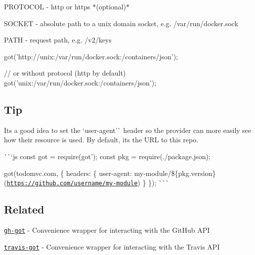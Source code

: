 \begin{DoxyItemize}
\item {\ttfamily P\+R\+O\+T\+O\+C\+OL} -\/ {\ttfamily http} or {\ttfamily https} $\ast$(optional)$\ast$
\item {\ttfamily S\+O\+C\+K\+ET} -\/ absolute path to a unix domain socket, e.\+g. {\ttfamily /var/run/docker.sock}
\item {\ttfamily P\+A\+TH} -\/ request path, e.\+g. {\ttfamily /v2/keys}
\end{DoxyItemize}


\begin{DoxyCode}
got('http://unix:/var/run/docker.sock:/containers/json');

// or without protocol (http by default)
got('unix:/var/run/docker.sock:/containers/json');
\end{DoxyCode}


\subsection*{Tip}

It\textquotesingle{}s a good idea to set the `\textquotesingle{}user-\/agent'\`{} header so the provider can more easily see how their resource is used. By default, it\textquotesingle{}s the U\+RL to this repo.

\`{}\`{}`js const got = require(\textquotesingle{}got'); const pkg = require(\textquotesingle{}./package.json\textquotesingle{});

got(\textquotesingle{}todomvc.\+com\textquotesingle{}, \{ headers\+: \{ \textquotesingle{}user-\/agent\textquotesingle{}\+: {\ttfamily my-\/module/\$\{pkg.\+version\} (\href{https://github.com/username/my-module}{\tt https\+://github.\+com/username/my-\/module})} \} \}); \`{}\`{}\`{}

\subsection*{Related}


\begin{DoxyItemize}
\item \href{https://github.com/sindresorhus/gh-got}{\tt gh-\/got} -\/ Convenience wrapper for interacting with the Git\+Hub A\+PI
\item \href{https://github.com/samverschueren/travis-got}{\tt travis-\/got} -\/ Convenience wrapper for interacting with the Travis A\+PI
\end{DoxyItemize}


